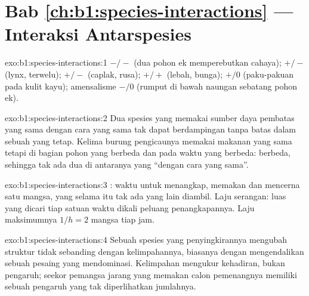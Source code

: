 \section*{Bab \ref{ch:b1:species-interactions} --- Interaksi Antarspesies}

\begin{solution}{exo:b1:species-interactions:1}
 $-/-$ (dua pohon ek memperebutkan cahaya);  $+/-$
(lynx, terwelu);  $+/-$ (caplak, rusa);  $+/+$
(lebah, bunga);  $+/0$ (paku-pakuan pada kulit kayu);
amensalisme $-/0$ (rumput di bawah naungan sebatang pohon ek).
\end{solution}

\begin{solution}{exo:b1:species-interactions:2}
Dua spesies yang memakai sumber daya pembatas yang sama dengan cara
yang sama tak dapat berdampingan tanpa batas dalam sebuah 
yang tetap. Kelima burung pengicaunya memakai makanan yang sama tetapi
di bagian pohon yang berbeda dan pada waktu yang berbeda: 
berbeda, sehingga tak ada dua di antaranya yang ``dengan cara yang
sama''.
\end{solution}

\begin{solution}{exo:b1:species-interactions:3}
: waktu untuk menangkap, memakan dan mencerna satu
mangsa, yang selama itu tak ada yang lain diambil. Laju serangan: luas
yang dicari tiap satuan waktu dikali peluang penangkapannya. Laju
maksimumnya $1/h = 2$ mangsa tiap jam.
\end{solution}

\begin{solution}{exo:b1:species-interactions:4}
Sebuah spesies yang penyingkirannya mengubah struktur 
tidak sebanding dengan kelimpahannya, biasanya dengan mengendalikan
sebuah pesaing yang mendominasi. Kelimpahan mengukur kehadiran, bukan
pengaruh; seekor pemangsa jarang yang memakan calon pemenangnya
memiliki sebuah pengaruh yang tak diperlihatkan jumlahnya.
\end{solution}

